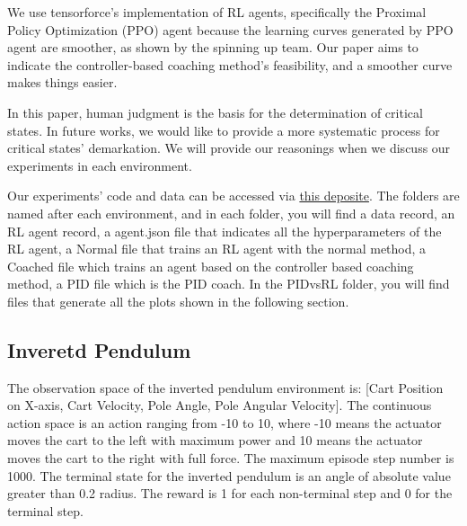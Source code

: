 \documentclass[journal]{IEEEtran}
\begin{document}
We use tensorforce's\cite{tensorforce} implementation of RL agents, specifically the Proximal Policy Optimization (PPO) agent because the learning curves generated by PPO agent are smoother, as shown by the spinning up\cite{SpinningUp2018} team. Our paper aims to indicate the controller-based coaching method's feasibility, and a smoother curve makes things easier. 

In this paper, human judgment is the basis for the determination of critical states. In future works, we would like to provide a more systematic process for critical states' demarkation. We will provide our reasonings when we discuss our experiments in each environment. 


Our experiments' code and data can be accessed via \href{https://github.com/BaiLiping/Coaching}{this deposite}. The folders are named after each environment, and in each folder, you will find a data record, an RL agent record, a agent.json file that indicates all the hyperparameters of the RL agent, a Normal file that trains an RL agent with the normal method, a Coached file which trains an agent based on the controller based coaching method, a PID file which is the PID coach. In the PIDvsRL folder, you will find files that generate all the plots shown in the following section.
\subsection{Inveretd Pendulum}
The observation space of the inverted pendulum environment is: [Cart Position on X-axis, Cart Velocity, Pole Angle, Pole Angular Velocity]. The continuous action space is an action ranging from -10 to 10, where -10 means the actuator moves the cart to the left with maximum power and 10 means the actuator moves the cart to the right with full force. The maximum episode step number is 1000. The terminal state for the inverted pendulum is an angle of absolute value greater than 0.2 radius. The reward is 1 for each non-terminal step and 0 for the terminal step. 
\end{document}
